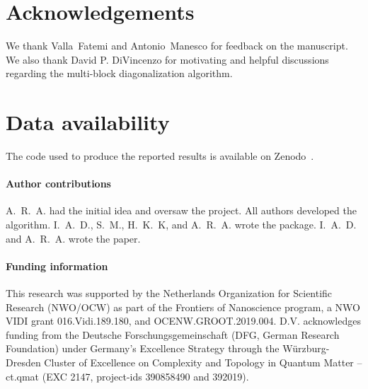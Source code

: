 \section*{Acknowledgements}
We thank Valla~Fatemi and Antonio~Manesco for feedback on the manuscript.
We also thank David P. DiVincenzo for motivating and helpful discussions regarding the multi-block diagonalization algorithm.

\section*{Data availability}
The code used to produce the reported results is available on Zenodo~\cite{Araya_2024}.

\paragraph{Author contributions}
A.~R.~A. had the initial idea and oversaw the project.
All authors developed the algorithm.
I.~A.~D., S.~M., H.~K.~K, and A.~R.~A. wrote the package.
I.~A.~D. and A.~R.~A. wrote the paper.

\paragraph{Funding information}
This research was supported by the Netherlands Organization for Scientific Research (NWO/OCW) as part of the Frontiers of Nanoscience program, a NWO VIDI grant 016.Vidi.189.180, and OCENW.GROOT.2019.004.
D.V. acknowledges funding from the Deutsche Forschungsgemeinschaft (DFG, German Research Foundation) under Germany’s Excellence Strategy through the W\"{u}rzburg-Dresden Cluster of Excellence on Complexity and
Topology in Quantum Matter – ct.qmat (EXC 2147, project-ids 390858490 and 392019).
